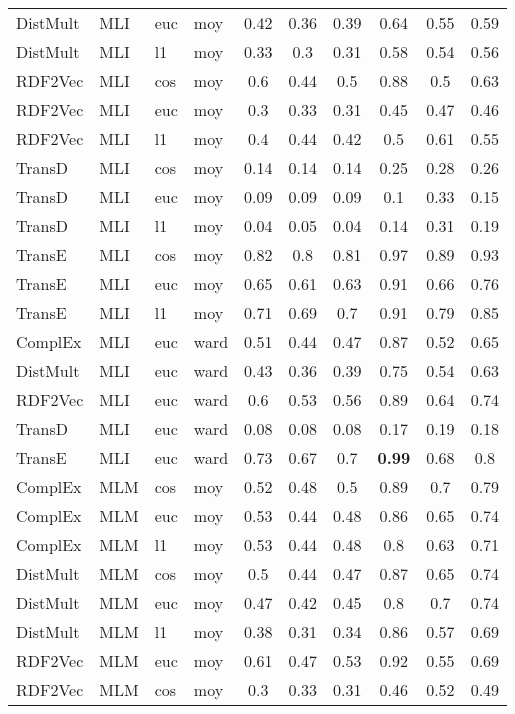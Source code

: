 \begin{longtable}{|llll|ccc|ccc|}
DistMult	&	MLI	&	euc	&	moy	&	0.42	&	0.36	&	0.39	&	0.64	&	0.55	&	0.59 \\ 
DistMult	&	MLI	&	l1	&	moy	&	0.33	&	0.3	&	0.31	&	0.58	&	0.54	&	0.56 \\ 
RDF2Vec	&	MLI	&	cos	&	moy	&	0.6	&	0.44	&	0.5	&	0.88	&	0.5	&	0.63 \\ 
RDF2Vec	&	MLI	&	euc	&	moy	&	0.3	&	0.33	&	0.31	&	0.45	&	0.47	&	0.46 \\ 
RDF2Vec	&	MLI	&	l1	&	moy	&	0.4	&	0.44	&	0.42	&	0.5	&	0.61	&	0.55 \\ 
TransD	&	MLI	&	cos	&	moy	&	0.14	&	0.14	&	0.14	&	0.25	&	0.28	&	0.26 \\ 
TransD	&	MLI	&	euc	&	moy	&	0.09	&	0.09	&	0.09	&	0.1	&	0.33	&	0.15 \\ 
TransD	&	MLI	&	l1	&	moy	&	0.04	&	0.05	&	0.04	&	0.14	&	0.31	&	0.19 \\ 
TransE	&	MLI	&	cos	&	moy	&	0.82	&	0.8	&	0.81	&	0.97	&	0.89	&	0.93 \\ 
TransE	&	MLI	&	euc	&	moy	&	0.65	&	0.61	&	0.63	&	0.91	&	0.66	&	0.76 \\ 
TransE	&	MLI	&	l1	&	moy	&	0.71	&	0.69	&	0.7	&	0.91	&	0.79	&	0.85 \\ 
ComplEx	&	MLI	&	euc	&	ward	&	0.51	&	0.44	&	0.47	&	0.87	&	0.52	&	0.65 \\ 
DistMult	&	MLI	&	euc	&	ward	&	0.43	&	0.36	&	0.39	&	0.75	&	0.54	&	0.63 \\ 
RDF2Vec	&	MLI	&	euc	&	ward	&	0.6	&	0.53	&	0.56	&	0.89	&	0.64	&	0.74 \\ 
TransD	&	MLI	&	euc	&	ward	&	0.08	&	0.08	&	0.08	&	0.17	&	0.19	&	0.18 \\ 
TransE	&	MLI	&	euc	&	ward	&	0.73	&	0.67	&	0.7	&	\textbf{0.99}	&	0.68	&	0.8 \\
\hline
ComplEx	&	MLM	&	cos	&	moy	&	0.52	&	0.48	&	0.5	&	0.89	&	0.7	&	0.79 \\ 
ComplEx	&	MLM	&	euc	&	moy	&	0.53	&	0.44	&	0.48	&	0.86	&	0.65	&	0.74 \\ 
ComplEx	&	MLM	&	l1	&	moy	&	0.53	&	0.44	&	0.48	&	0.8	&	0.63	&	0.71 \\ 
DistMult	&	MLM	&	cos	&	moy	&	0.5	&	0.44	&	0.47	&	0.87	&	0.65	&	0.74 \\ 
DistMult	&	MLM	&	euc	&	moy	&	0.47	&	0.42	&	0.45	&	0.8	&	0.7	&	0.74 \\ 
DistMult	&	MLM	&	l1	&	moy	&	0.38	&	0.31	&	0.34	&	0.86	&	0.57	&	0.69 \\ 
RDF2Vec	&	MLM	&	euc	&	moy	&	0.61	&	0.47	&	0.53	&	0.92	&	0.55	&	0.69 \\ 
RDF2Vec	&	MLM	&	cos	&	moy	&	0.3	&	0.33	&	0.31	&	0.46	&	0.52	&	0.49 \\ 

\end{longtable}
